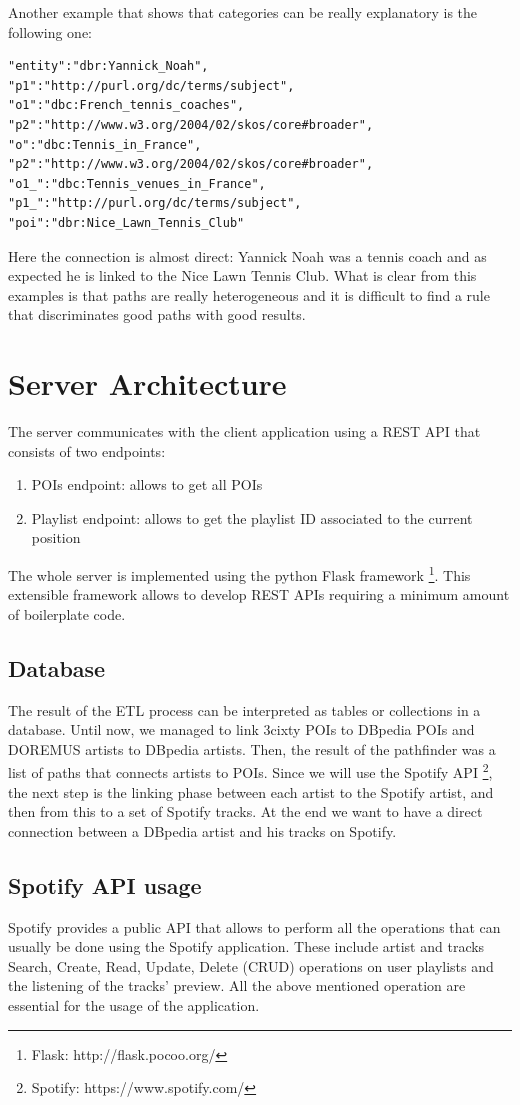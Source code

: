 \documentclass[paper=a4, fontsize=11pt]{scrartcl}
\begin{document}
Another example that shows that categories can be really explanatory is the following one:
\begin{lstlisting}
"entity":"dbr:Yannick_Noah",
"p1":"http://purl.org/dc/terms/subject",
"o1":"dbc:French_tennis_coaches",
"p2":"http://www.w3.org/2004/02/skos/core#broader",
"o":"dbc:Tennis_in_France",
"p2":"http://www.w3.org/2004/02/skos/core#broader",
"o1_":"dbc:Tennis_venues_in_France",
"p1_":"http://purl.org/dc/terms/subject",
"poi":"dbr:Nice_Lawn_Tennis_Club"
\end{lstlisting}

Here the connection is almost direct: Yannick Noah was a tennis coach and as expected he is linked to the Nice Lawn Tennis Club.
What is clear from this examples is that paths are really heterogeneous and it is difficult to find a rule that discriminates good paths with good results.

\section{Server Architecture}
The server communicates with the client application using a REST API that consists of two endpoints:
\begin{enumerate}
\item POIs endpoint: allows to get all POIs
\item Playlist endpoint: allows to get the playlist ID associated to the current position
\end{enumerate}
The whole server is implemented using the python Flask framework \footnote{Flask: http://flask.pocoo.org/}. This extensible framework allows to develop REST APIs requiring a minimum amount of boilerplate code.

\subsection{Database}
The result of the ETL process can be interpreted as tables or collections in a database.
Until now, we managed to link 3cixty POIs to DBpedia POIs and DOREMUS artists to DBpedia artists. Then, the result of the pathfinder was a list of paths that connects artists to POIs.
Since we will use the Spotify API \footnote{Spotify: https://www.spotify.com/}, the next step is the linking phase between each artist to the Spotify artist, and then from this to a set of Spotify tracks.
At the end we want to have a direct connection between a DBpedia artist and his tracks on Spotify.

\subsection{Spotify API usage}
Spotify provides a public API that allows to perform all the operations that can usually be done using the Spotify application. These include artist and tracks Search, Create, Read, Update, Delete (CRUD) operations on user playlists and the listening of the tracks' preview.
All the above mentioned operation are essential for the usage of the application.
\end{document}
